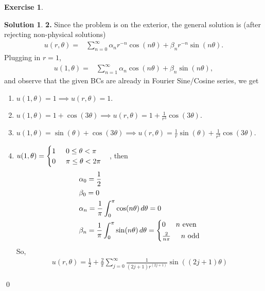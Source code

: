 \documentclass{article}
\theoremstyle{definition}
\newtheorem*{exer*}{Exercise}
\newtheorem*{sln*}{Solution}
\newcommand{\f}[2]{\frac{#1}{#2}}
\begin{document}
\begin{exer*}
	\begin{sln*}\textbf{2. }
		Since the problem is on the exterior, the general solution is (after rejecting non-physical solutions)
		\begin{align*}
		u(r,\theta) =& \sum^\infty_{n=0}\alpha_n r^{-n}\cos(n\theta) + \beta_n r^{-n}\sin(n\theta). 
		\end{align*}
		Plugging in $r=1$,
		\begin{align*}
		u(1,\theta) =& \sum^\infty_{n=1}\alpha_n \cos(n\theta) + \beta_n \sin(n\theta),
		\end{align*}
		and observe that the given BCs are already in Fourier Sine/Cosine series, we get
\begin{enumerate}
	\item $u(1,\theta) = 1 \implies u(r,\theta) = \boxed{1}$.
	\item $u(1,\theta) = 1 + \cos(3\theta) \implies u(r,\theta) = \boxed{1 + \f{1}{r^3}\cos(3\theta)}
	$.
	\item $u(1,\theta) = \sin(\theta) + \cos(3\theta) \implies u(r,\theta) = \boxed{\f{1}{r}\sin(\theta) + \f{1}{r^3}\cos(3\theta)}$.
	\item $u(1,\theta) = \begin{cases}
	1 \hspace{0.5cm} 0 \leq \theta < \pi\\
	0 \hspace{0.5cm} \pi \leq \theta < 2\pi
	\end{cases}$, then
	\begin{align*}
	&\alpha_0 = \f{1}{2}\\
	&\beta_0 = 0\\
	&\alpha_n = \f{1}{\pi}\int_0^{\pi}\cos(n\theta)\,d\theta = 0\\
	&\beta_n = \f{1}{\pi}\int^{\pi}_0 \sin(n\theta)\,d\theta = \begin{cases*}
	0 \hspace{0.5cm} n \text{ even}\\
	\f{2}{n\pi} \hspace{0.5cm} n \text{ odd}
	\end{cases*}
	\end{align*}
	So,
	\begin{align*}
	\boxed{u(r,\theta) = \f{1}{2} + \f{2}{\pi}
		\sum^\infty_{j=0} \f{1}{(2j+1)r^{(2j+1)}}\sin((2j+1)\theta)}
	\end{align*} 
\end{enumerate}\qed
	\end{sln*}
\end{exer*}
\newpage
\end{document}
